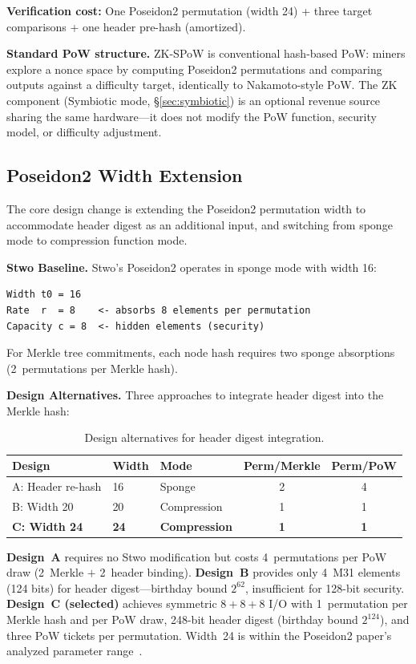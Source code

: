 \documentclass[11pt,a4paper]{article}
\begin{document}
\textbf{Verification cost:} One Poseidon2 permutation (width 24) + three target comparisons + one header pre-hash (amortized).

\textbf{Standard PoW structure.} ZK-SPoW is conventional hash-based PoW: miners explore a nonce space by computing Poseidon2 permutations and comparing outputs against a difficulty target, identically to Nakamoto-style PoW. The ZK component (Symbiotic mode, \S\ref{sec:symbiotic}) is an optional revenue source sharing the same hardware---it does not modify the PoW function, security model, or difficulty adjustment.

\subsection{Poseidon2 Width Extension}
\label{sec:width}

The core design change is extending the Poseidon2 permutation width to accommodate header digest as an additional input, and switching from sponge mode to compression function mode.

\textbf{Stwo Baseline.} Stwo's Poseidon2 operates in sponge mode with width 16:
\begin{Verbatim}[fontsize=\small]
Width t0 = 16
Rate  r  = 8    <- absorbs 8 elements per permutation
Capacity c = 8  <- hidden elements (security)
\end{Verbatim}
For Merkle tree commitments, each node hash requires two sponge absorptions (2~permutations per Merkle hash).

\textbf{Design Alternatives.} Three approaches to integrate header digest into the Merkle hash:

\begin{table}[h]
\centering
\small
\begin{tabular}{@{}lllcc@{}}
\toprule
Design & Width & Mode & Perm/Merkle & Perm/PoW \\
\midrule
A: Header re-hash & 16 & Sponge & 2 & 4 \\
B: Width 20 & 20 & Compression & 1 & 1 \\
\textbf{C: Width 24} & \textbf{24} & \textbf{Compression} & \textbf{1} & \textbf{1} \\
\bottomrule
\end{tabular}
\caption{Design alternatives for header digest integration.}
\label{tab:designs}
\end{table}

\textbf{Design~A} requires no Stwo modification but costs 4~permutations per PoW draw (2~Merkle $+$ 2~header binding). \textbf{Design~B} provides only 4~M31 elements (124 bits) for header digest---birthday bound $2^{62}$, insufficient for 128-bit security. \textbf{Design~C (selected)} achieves symmetric $8{+}8{+}8$ I/O with 1~permutation per Merkle hash and per PoW draw, 248-bit header digest (birthday bound $2^{124}$), and three PoW tickets per permutation. Width~24 is within the Poseidon2 paper's analyzed parameter range~\cite{poseidon2}.
\end{document}
